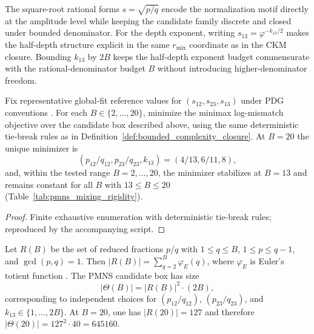 \begin{remark}\label{rem:pmns_bounds_rationale}
The square-root rational forms $s=\sqrt{p/q}$ encode the normalization motif directly at the amplitude level while keeping the candidate family discrete and closed under bounded denominator.
For the depth exponent, writing $s_{13}=\varphi^{-k_{13}/2}$ makes the half-depth structure explicit in the same $r_{\mathrm{mix}}$ coordinate as in the CKM closure.
Bounding $k_{13}$ by $2B$ keeps the half-depth exponent budget commensurate with the rational-denominator budget $B$ without introducing higher-denominator freedom.
\end{remark}

\begin{proposition}\label{prop:pmns_mixing_rigidity}
Fix representative global-fit reference values for $(s_{12},s_{23},s_{13})$ under PDG conventions \cite{PDGRPP2024,Esteban2020NuFIT}.
For each $B\in\{2,\dots,20\}$, minimize the minimax log-mismatch objective over the candidate box described above, using the same deterministic tie-break rules as in Definition~\ref{def:bounded_complexity_closure}.
At $B=20$ the unique minimizer is
\[
(p_{12}/q_{12},p_{23}/q_{23},k_{13})=(4/13,6/11,8),
\]
and, within the tested range $B=2,\dots,20$, the minimizer stabilizes at $B=13$ and remains constant for all $B$ with $13\le B\le 20$ (Table~\ref{tab:pmns_mixing_rigidity}).
\end{proposition}
\begin{proof}
Finite exhaustive enumeration with deterministic tie-break rules; reproduced by the accompanying script.
\end{proof}

\begin{remark}\label{rem:pmns_domain_size}
Let $R(B)$ be the set of reduced fractions $p/q$ with $1\le q\le B$, $1\le p\le q-1$, and $\gcd(p,q)=1$.
Then $|R(B)|=\sum_{q=2}^{B}\varphi_E(q)$, where $\varphi_E$ is Euler's totient function \cite{HardyWright2008}.
The PMNS candidate box has size
\[
|\Theta(B)|=|R(B)|^2\cdot (2B),
\]
corresponding to independent choices for $(p_{12}/q_{12})$, $(p_{23}/q_{23})$, and $k_{13}\in\{1,\dots,2B\}$.
At $B=20$, one has $|R(20)|=127$ and therefore $|\Theta(20)|=127^2\cdot 40=645160$.
\end{remark}

